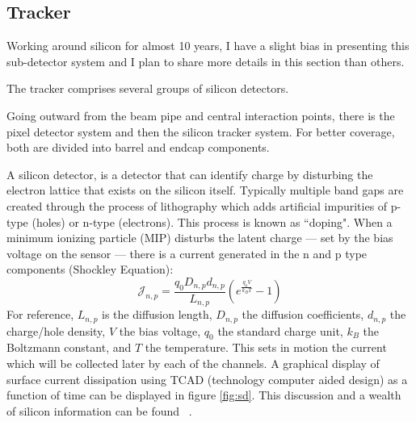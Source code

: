 \subsection{Tracker}
Working around silicon for almost 10 years, I have a slight bias in presenting this sub-detector system and I plan to share more details in this section than others. 

The tracker comprises several groups of silicon detectors. 


Going outward from the beam pipe and central interaction points, there is the pixel detector system and then the silicon tracker system. For better coverage, both are divided into barrel and endcap components. 

A silicon detector, is a detector that can identify charge by disturbing the electron lattice that exists on the silicon itself. 
Typically multiple band gaps are created through the process of lithography which adds artificial impurities of p-type (holes) or n-type (electrons). This process is known as ``doping". When a minimum ionizing particle (MIP) disturbs the latent charge --- set by the bias voltage on the sensor --- there is a current generated in the n and p type components (Shockley Equation):
\begin{equation}
\label{eq:shockleyn}
\mathcal{J}_{n,p} = \frac{q_0 D_{n,p} d_{n,p}}{L_{n,p}}\left(e^{\frac{q_0 V}{k_B T}} - 1 \right)
\end{equation}
For reference, $L_{n,p}$ is the diffusion length, $D_{n,p}$ the diffusion coefficients, $d_{n,p}$ the charge/hole density, $V$ the bias voltage, $q_0$ the standard charge unit, $k_B$ the Boltzmann constant, and $T$ the temperature. 
This sets in motion the current which will be collected later by each of the channels. A graphical display of surface current dissipation using TCAD (technology computer aided design) as a function of time can be displayed in figure \ref{fig:sd}. This discussion and a wealth of silicon information can be found ~\cite{Eichhorn:2112017}.

